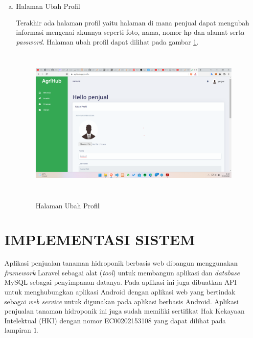 \begin{enumerate}
\begin{enumerate}[a.]
		\newpage
		\item Halaman Ubah Profil
		\par Terakhir ada halaman profil yaitu halaman di mana penjual dapat mengubah informasi mengenai akunnya seperti foto, nama, nomor hp dan alamat serta \textit{password}. Halaman ubah profil dapat dilihat pada gambar \ref*{profil}.
		\begin{figure}[H]
			\centering
			{\includegraphics [width = 13cm, height= 7.5cm]{gambar/penjual/profil}}
			\caption{Halaman Ubah Profil}
			\label{profil}
		\end{figure}
	\end{enumerate}
\end{enumerate}

\section{\uppercase{Implementasi Sistem}}
Aplikasi penjualan tanaman hidroponik berbasis web dibangun
menggunakan \textit{framework} Laravel sebagai alat (\textit{tool}) untuk membangun aplikasi dan \textit{database} MySQL sebagai penyimpanan datanya. Pada aplikasi ini juga dibuatkan API untuk menghubungkan aplikasi Android dengan aplikasi web yang bertindak sebagai \textit{web service} untuk digunakan pada aplikasi berbasis Android. Aplikasi penjualan tanaman hidroponik ini juga sudah memiliki sertifikat Hak Kekayaan Intelektual (HKI) dengan nomor EC00202153108 yang dapat dilihat pada lampiran 1.


